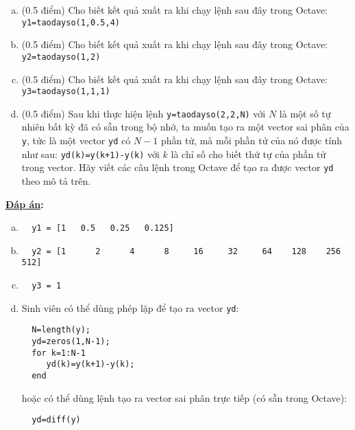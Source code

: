 \documentclass[12pt]{article}
\newcommand{\Solution}{
\medskip
{\bf \underline{Đáp án}:}
}
\begin{document}
\begin{enumerate}[a).]
 \item (0.5 điểm) Cho biết kết quả xuất ra khi chạy lệnh sau đây trong Octave: 
  \texttt{y1=taodayso(1,0.5,4)}
 \item (0.5 điểm) Cho biết kết quả xuất ra khi chạy lệnh sau đây trong Octave:
  \texttt{y2=taodayso(1,2)}
 \item (0.5 điểm) Cho biết kết quả xuất ra khi chạy lệnh sau đây trong Octave:
  \texttt{y3=taodayso(1,1,1)}
 \item (0.5 điểm) Sau khi thực hiện lệnh \texttt{y=taodayso(2,2,N)} với $N$ là một số tự nhiên bất kỳ đã có sẵn trong bộ nhớ, ta muốn tạo ra một vector sai phân của \texttt{y}, tức là một vector \texttt{yd} có $N-1$ phần tử, mà mỗi phần tử của nó được tính như sau: \texttt{yd(k)=y(k+1)-y(k)} với $k$ là chỉ số cho biết thứ tự của phần tử trong vector. Hãy viết các câu lệnh trong Octave để tạo ra được vector \texttt{yd} theo mô tả trên.
\end{enumerate}

\Solution 

\begin{enumerate}[a).]
 \item 
  \begin{verbatim}
  y1 = [1   0.5   0.25   0.125]
  \end{verbatim}
 \item 
  \begin{verbatim}
  y2 = [1      2      4      8     16     32     64    128    256    512]
  \end{verbatim}
 \item 
  \begin{verbatim}
  y3 = 1
  \end{verbatim}
 \item Sinh viên có thể dùng phép lặp để tạo ra vector \texttt{yd}:
  \begin{verbatim}
  N=length(y);
  yd=zeros(1,N-1);
  for k=1:N-1
     yd(k)=y(k+1)-y(k);
  end
  \end{verbatim}
  hoặc có thể dùng lệnh tạo ra vector sai phân trực tiếp (có sẵn trong Octave):
  \begin{verbatim}
  yd=diff(y)
  \end{verbatim}
\end{enumerate}
\end{document}
